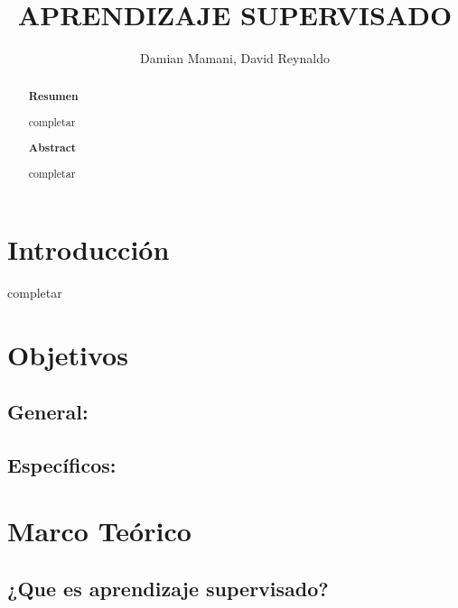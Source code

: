 \documentclass[%
 reprint,
 amsmath,amssymb,
 aps,
]{revtex4-1}
\begin{document}
\title{ APRENDIZAJE SUPERVISADO}
\author{Damian Mamani, David Reynaldo 	  }
		
%

\begin{abstract}
\begin{center}
\textbf{Resumen}
\end{center}
completar
\\

\begin{center}
\textbf{Abstract}
\end{center}
completar
\\
\end{abstract}



\maketitle


\section {Introducción}\label{sec:1}

completar

\section{Objetivos}\label{sec:2}
\subsection{General:}

\subsection{Específicos:}


\section {Marco Teórico}

\subsection{¿Que es aprendizaje supervisado?}	
\end{document}
